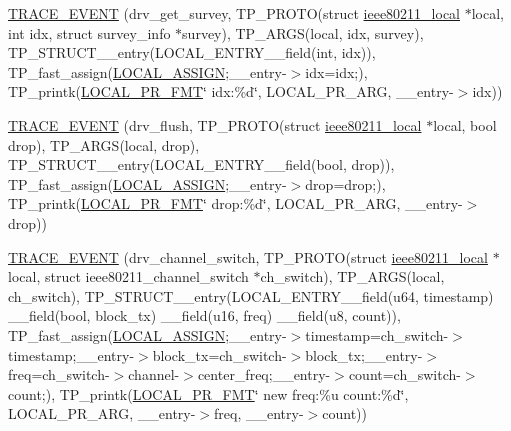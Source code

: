\begin{DoxyCompactItemize}
\item 
\hyperlink{driver-trace_8h_a77d0be7f5c8f98b46b95c9045964f6cf}{T\-R\-A\-C\-E\-\_\-\-E\-V\-E\-N\-T} (drv\-\_\-get\-\_\-survey, T\-P\-\_\-\-P\-R\-O\-T\-O(struct \hyperlink{structieee80211__local}{ieee80211\-\_\-local} $\ast$local, int idx, struct survey\-\_\-info $\ast$survey), T\-P\-\_\-\-A\-R\-G\-S(local, idx, survey), T\-P\-\_\-\-S\-T\-R\-U\-C\-T\-\_\-\-\_\-entry(L\-O\-C\-A\-L\-\_\-\-E\-N\-T\-R\-Y\-\_\-\-\_\-field(int, idx)), T\-P\-\_\-fast\-\_\-assign(\hyperlink{driver-trace_8h_ab19d9141887ea92ef9640df06a51e0a1}{L\-O\-C\-A\-L\-\_\-\-A\-S\-S\-I\-G\-N};\-\_\-\-\_\-entry-\/$>$idx=idx;), T\-P\-\_\-printk(\hyperlink{driver-trace_8h_a09833af423135e21ffe99a59ae088cf1}{L\-O\-C\-A\-L\-\_\-\-P\-R\-\_\-\-F\-M\-T}\char`\"{} idx\-:\%d\char`\"{}, L\-O\-C\-A\-L\-\_\-\-P\-R\-\_\-\-A\-R\-G, \-\_\-\-\_\-entry-\/$>$idx))
\item 
\hyperlink{driver-trace_8h_a1412feb2dcfea66357de2829d5acc061}{T\-R\-A\-C\-E\-\_\-\-E\-V\-E\-N\-T} (drv\-\_\-flush, T\-P\-\_\-\-P\-R\-O\-T\-O(struct \hyperlink{structieee80211__local}{ieee80211\-\_\-local} $\ast$local, bool drop), T\-P\-\_\-\-A\-R\-G\-S(local, drop), T\-P\-\_\-\-S\-T\-R\-U\-C\-T\-\_\-\-\_\-entry(L\-O\-C\-A\-L\-\_\-\-E\-N\-T\-R\-Y\-\_\-\-\_\-field(bool, drop)), T\-P\-\_\-fast\-\_\-assign(\hyperlink{driver-trace_8h_ab19d9141887ea92ef9640df06a51e0a1}{L\-O\-C\-A\-L\-\_\-\-A\-S\-S\-I\-G\-N};\-\_\-\-\_\-entry-\/$>$drop=drop;), T\-P\-\_\-printk(\hyperlink{driver-trace_8h_a09833af423135e21ffe99a59ae088cf1}{L\-O\-C\-A\-L\-\_\-\-P\-R\-\_\-\-F\-M\-T}\char`\"{} drop\-:\%d\char`\"{}, L\-O\-C\-A\-L\-\_\-\-P\-R\-\_\-\-A\-R\-G, \-\_\-\-\_\-entry-\/$>$drop))
\item 
\hyperlink{driver-trace_8h_a47eb198b2d9b480d7a1a83bd7883f1d0}{T\-R\-A\-C\-E\-\_\-\-E\-V\-E\-N\-T} (drv\-\_\-channel\-\_\-switch, T\-P\-\_\-\-P\-R\-O\-T\-O(struct \hyperlink{structieee80211__local}{ieee80211\-\_\-local} $\ast$local, struct ieee80211\-\_\-channel\-\_\-switch $\ast$ch\-\_\-switch), T\-P\-\_\-\-A\-R\-G\-S(local, ch\-\_\-switch), T\-P\-\_\-\-S\-T\-R\-U\-C\-T\-\_\-\-\_\-entry(L\-O\-C\-A\-L\-\_\-\-E\-N\-T\-R\-Y\-\_\-\-\_\-field(u64, timestamp) \-\_\-\-\_\-field(bool, block\-\_\-tx) \-\_\-\-\_\-field(u16, freq) \-\_\-\-\_\-field(u8, count)), T\-P\-\_\-fast\-\_\-assign(\hyperlink{driver-trace_8h_ab19d9141887ea92ef9640df06a51e0a1}{L\-O\-C\-A\-L\-\_\-\-A\-S\-S\-I\-G\-N};\-\_\-\-\_\-entry-\/$>$timestamp=ch\-\_\-switch-\/$>$timestamp;\-\_\-\-\_\-entry-\/$>$block\-\_\-tx=ch\-\_\-switch-\/$>$block\-\_\-tx;\-\_\-\-\_\-entry-\/$>$freq=ch\-\_\-switch-\/$>$channel-\/$>$center\-\_\-freq;\-\_\-\-\_\-entry-\/$>$count=ch\-\_\-switch-\/$>$count;), T\-P\-\_\-printk(\hyperlink{driver-trace_8h_a09833af423135e21ffe99a59ae088cf1}{L\-O\-C\-A\-L\-\_\-\-P\-R\-\_\-\-F\-M\-T}\char`\"{} new freq\-:\%u count\-:\%d\char`\"{}, L\-O\-C\-A\-L\-\_\-\-P\-R\-\_\-\-A\-R\-G, \-\_\-\-\_\-entry-\/$>$freq, \-\_\-\-\_\-entry-\/$>$count))

\end{DoxyCompactItemize}
